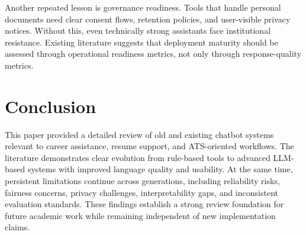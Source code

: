 \documentclass[conference]{IEEEtran}
\begin{document}
Another repeated lesson is governance readiness. Tools that handle personal documents need clear consent flows, retention policies, and user-visible privacy notices. Without this, even technically strong assistants face institutional resistance. Existing literature suggests that deployment maturity should be assessed through operational readiness metrics, not only through response-quality metrics.

\section{Conclusion}
This paper provided a detailed review of old and existing chatbot systems relevant to career assistance, resume support, and ATS-oriented workflows. The literature demonstrates clear evolution from rule-based tools to advanced LLM-based systems with improved language quality and usability. At the same time, persistent limitations continue across generations, including reliability risks, fairness concerns, privacy challenges, interpretability gaps, and inconsistent evaluation standards. These findings establish a strong review foundation for future academic work while remaining independent of new implementation claims.
\end{document}
